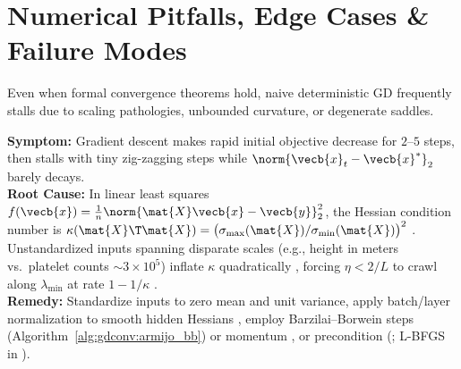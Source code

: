 \documentclass[../../../../master.tex]{subfiles}
\begin{document}
\section{Numerical Pitfalls, Edge Cases \& Failure Modes}
\label{sec:gdconv:pitfalls}

Even when formal convergence theorems hold, naive deterministic GD frequently stalls due to scaling pathologies, unbounded curvature, or degenerate saddles.

\begin{pitfall}
\textbf{Symptom:} Gradient descent makes rapid initial objective decrease for $2$--$5$ steps, then stalls with tiny zig-zagging steps while $\norm{\vecb{x}_t - \vecb{x}^*}_2$ barely decays. \\
\textbf{Root Cause:} In linear least squares $f(\vecb{x}) = \frac{1}{n}\norm{\mat{X}\vecb{x} - \vecb{y}}_2^2$, the Hessian condition number is $\kappa(\mat{X}\T\mat{X}) = \big(\sigma_{\max}(\mat{X})/\sigma_{\min}(\mat{X})\big)^2$ . Unstandardized inputs spanning disparate scales (e.g., height in meters vs.\ platelet counts $\sim 3\times 10^5$) inflate $\kappa$ quadratically , forcing $\eta < 2/L$ to crawl along $\lambda_{\min}$ at rate $1 - 1/\kappa$ . \\
\textbf{Remedy:} Standardize inputs to zero mean and unit variance, apply batch/layer normalization to smooth hidden Hessians , employ Barzilai--Borwein steps (Algorithm~\ref{alg:gdconv:armijo_bb}) or momentum , or precondition (; L-BFGS in ).
\end{pitfall}
\end{document}
